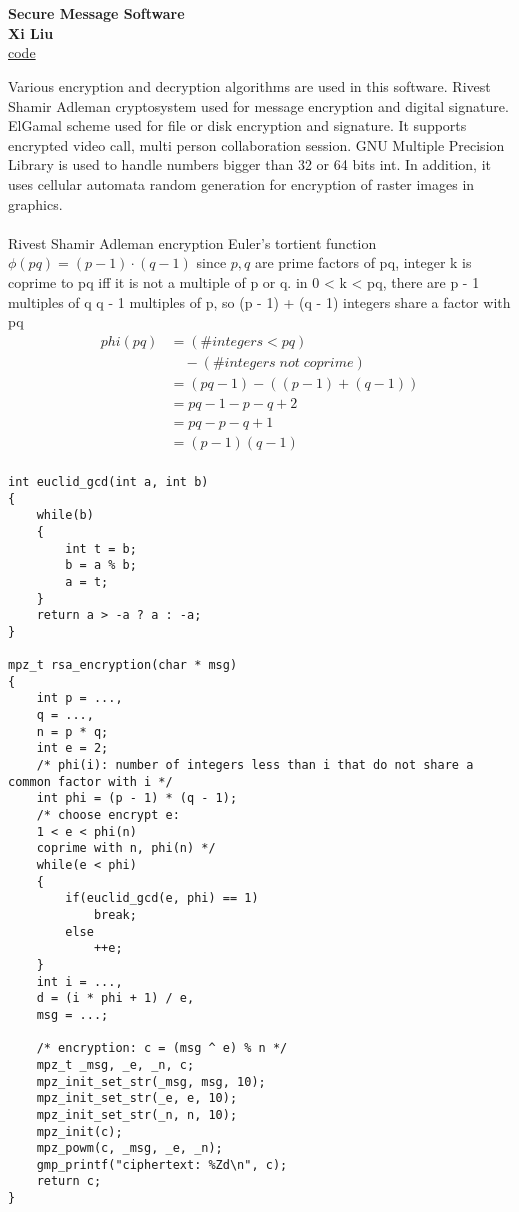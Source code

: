 \documentclass[12pt, border = 4pt, multi]{article} %
\begin{document}
\section*{}
\textbf{Secure Message Software}\\
\textbf{Xi Liu}\\
\href{https://github.com/xi-liu-cs/2022-summer/tree/main/cryptography/hw/6}{code}
\begin{multicols}{2}
\noindent 
Various encryption and decryption algorithms are used in this software. Rivest Shamir Adleman cryptosystem used for message encryption and digital signature. ElGamal scheme used for file or disk encryption and signature. It supports encrypted video call, multi person collaboration session. GNU Multiple Precision Library is used to handle numbers bigger than 32 or 64 bits int. In addition, it uses cellular automata random generation for encryption of raster images in graphics.\\
\\
Rivest Shamir Adleman encryption
Euler's tortient function $\phi(pq) = (p - 1) \cdot (q - 1)$ since $p, q$ are prime factors of pq, integer k is coprime to pq iff it is not a
multiple of p or q. in 0 < k < pq, there are p - 1 multiples of q
q - 1 multiples of p, so (p - 1) + (q - 1) integers share a factor with pq
\begin{align*}
phi(pq) &= (\#integers < pq)\\
&\quad- (\#integers\;not\;coprime)\\
&= (pq - 1) - ((p - 1) + (q - 1))\\
&= pq - 1 - p - q + 2\\
&= pq - p - q + 1\\
&= (p - 1)(q - 1)\\
\end{align*}
\begin{lstlisting}[morekeywords = {mpz_t}]
int euclid_gcd(int a, int b)
{
    while(b)
    {
        int t = b;
        b = a % b;
        a = t; 
    }
    return a > -a ? a : -a;
}

mpz_t rsa_encryption(char * msg)
{
	int p = ...,
	q = ...,
	n = p * q;
	int e = 2;
	/* phi(i): number of integers less than i that do not share a common factor with i */
	int phi = (p - 1) * (q - 1);
	/* choose encrypt e:
	1 < e < phi(n)
	coprime with n, phi(n) */
	while(e < phi)
	{
		if(euclid_gcd(e, phi) == 1)
			break;
		else
			++e;
	}
	int i = ...,
	d = (i * phi + 1) / e,
	msg = ...;

	/* encryption: c = (msg ^ e) % n */
	mpz_t _msg, _e, _n, c; 
	mpz_init_set_str(_msg, msg, 10);
	mpz_init_set_str(_e, e, 10);
	mpz_init_set_str(_n, n, 10);
	mpz_init(c);
	mpz_powm(c, _msg, _e, _n);
	gmp_printf("ciphertext: %Zd\n", c);
	return c;
}


\end{lstlisting}
\end{multicols}
\end{document}
